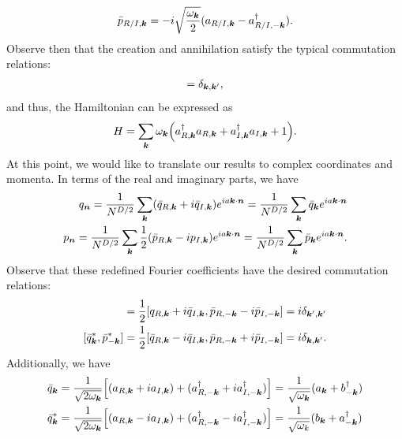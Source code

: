 {\begin{align}
    \bar{p}_{R/I,\vb*{k}} = -i \sqrt{\frac{\omega_{\vb*{k}}}{2}} ( a_{R/I,\vb*{k}} - a_{R/I,-\vb*{k}}^{\dagger} )
.\end{align}
Observe then that the creation and annihilation satisfy the typical commutation relations:
\begin{align}
    [a_{R/I,\vb*{k}},a_{R/I,\vb*{k}'}^{\dagger}] = \delta_{\vb*{k},\vb*{k}'}
,\end{align}
and thus, the Hamiltonian can be expressed as
\begin{align}
    H = \sum_{\vb*{k}} \omega_{\vb*{k}} \Big( a_{R,\vb*{k}}^{\dagger} a_{R,\vb*{k}} + a_{I,\vb*{k}}^{\dagger} a_{I,\vb*{k}} + 1 \Big)
.\end{align}
At this point, we would like to translate our results to complex coordinates and momenta.
In terms of the real and imaginary parts, we have
\begin{align}
    q_{\vb*{n}} = \frac{1}{N^{D/2}} \sum_{\vb*{k}} (\bar{q}_{R,\vb*{k}} + i \bar{q}_{I,\vb*{k}}) e^{i a \vb*{k} \cdot \vb*{n}} = \frac{1}{N^{D/2}} \sum_{\vb*{k}} \bar{q}_{\vb*{k}} e^{i a \vb*{k} \cdot \vb*{n}} \nonumber \\
    p_{\vb*{n}} = \frac{1}{N^{D/2}} \sum_{\vb*{k}} \frac{1}{2} ( \bar{p}_{R,\vb*{k}} - i p_{I,\vb*{k}} ) e^{i a \vb*{k} \cdot \vb*{n}} = \frac{1}{N^{D/2}} \sum_{\vb*{k}} \bar{p}_{\vb*{k}} e^{i a \vb*{k} \cdot \vb*{n}}
.\end{align}
Observe that these redefined Fourier coefficients have the desired commutation relations:
\begin{align}
    [\bar{q}_{\vb*{k}},\bar{p}_{-\vb*{k}}] = \frac{1}{2} [q_{R,\vb*{k}} + i \bar{q}_{I,\vb*{k}}, \bar{p}_{R,-\vb*{k}} - i \bar{p}_{I,-\vb*{k}}] = i \delta_{\vb*{k}',\vb*{k}'} \\
    [\bar{q}_{\vb*{k}}^{*},\bar{p}_{-\vb*{k}}^{*}] = \frac{1}{2} [ \bar{q}_{R,\vb*{k}} - i \bar{q}_{I,\vb*{k}}, \bar{p}_{R,-\vb*{k}} + i \bar{p}_{I,-\vb*{k}} ] = i \delta_{\vb*{k},\vb*{k}'}
.\end{align}
Additionally, we have 
\begin{align}
    \bar{q}_{\vb*{k}} &= \frac{1}{\sqrt{2 \omega_{\vb*{k}}}} \Big[ ( a_{R,\vb*{k}} + i a_{I,\vb*{k}} ) + ( a_{R,-\vb*{k}}^{\dagger} + i a_{I,-\vb*{k}}^{\dagger} ) \Big] = \frac{1}{\sqrt{\omega_{\vb*{k}}}} ( a_{\vb*{k}} + b_{-\vb*{k}}^{\dagger} ) \\
    \bar{q}_{\vb*{k}}^{*} &= \frac{1}{\sqrt{2 \omega_{\vb*{k}}}} \Big[ ( a_{R,\vb*{k}} - i a_{I,\vb*{k}} ) + ( a_{R,-\vb*{k}}^{\dagger} - i a_{I,-\vb*{k}}^{\dagger} ) \Big] = \frac{1}{\sqrt{\omega_{k}}} ( b_{\vb*{k}} + a_{-\vb*{k}}^{\dagger} )

\end{align}}
